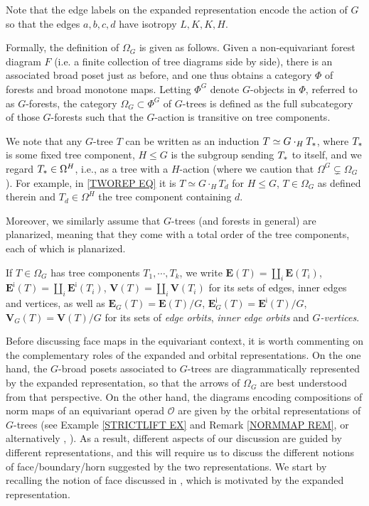 \documentclass[a4paper,10pt
]{article}%
\begin{document}
Note that the edge labels on the expanded representation encode the action of $G$ so that the edges 
$a,b,c,d$ have isotropy $L,K,K,H$.

Formally, the definition of $\Omega_G$ \cite[Def. 5.44]{Per17} is given as follows.
Given a non-equivariant forest diagram $F$ 
(i.e. a finite collection of tree diagrams side by side),
there is
an associated broad poset just as before, and one thus obtains a category $\Phi$ of forests and broad monotone maps.
Letting $\Phi^G$ denote $G$-objects in $\Phi$, referred to as $G$-forests,
the category $\Omega_G \subset \Phi^G$ of $G$-trees
is defined as the full subcategory of those $G$-forests such that the $G$-action is transitive on tree components.

We note that any $G$-tree $T$ can be written as
an induction $T \simeq G \cdot_H T_{\**}$, where $T_{\**}$ is some fixed tree component, $H\leq G$ is the subgroup sending $T_{\**}$ to itself,
and we regard $T_{\**} \in \Omega^H$, i.e., as a tree with a $H$-action (where we caution that $\Omega^G \subsetneq \Omega_G$).
For example, in \eqref{TWOREP EQ} it is 
$T \simeq G \cdot_H T_d$ for $H\leq G$, $T \in \Omega_G$ as defined therein and
$T_d \in \Omega^H$ the tree component containing $d$. 

Moreover, we similarly assume that $G$-trees (and forests in general) are planarized, meaning that they come with a total order of the tree components, each of which is  planarized.

If $T\in \Omega_G$ has tree components $T_1,\cdots, T_k$, we write
$\boldsymbol{E}(T) = \amalg_i \boldsymbol{E}(T_i)$, 
$\boldsymbol{E}^{\mathsf{i}}(T) = 
\amalg_i \boldsymbol{E}^{\mathsf{i}}(T_i)$,
$\boldsymbol{V}(T) = \amalg_i \boldsymbol{V}(T_i)$
for its sets of edges, inner edges and vertices, as well as
$\boldsymbol{E}_G(T) = \boldsymbol{E}(T)/G$,
$\boldsymbol{E}^{\mathsf{i}}_G(T) = \boldsymbol{E}^{\mathsf{i}}(T)/G$,
$\boldsymbol{V}_G(T) = \boldsymbol{V}(T)/G$ for its sets of 
\textit{edge orbits},
\textit{inner edge orbits} and
\textit{$G$-vertices}.

Before discussing face maps in the equivariant context, it is worth commenting on the complementary roles of the expanded and orbital representations.
On the one hand, the $G$-broad posets associated to $G$-trees are diagrammatically represented by the expanded representation,
so that the arrows of $\Omega_{G}$ are best understood from that perspective.
On the other hand, the diagrams encoding compositions of norm maps of an equivariant operad $\mathcal{O}$
are given by the orbital representations of  
$G$-trees (see Example \ref{STRICTLIFT EX} and Remark \ref{NORMMAP REM}, or alternatively 
\cite[Ex. 4.9]{Per17}, \cite[(1.10)]{BP17}).
As a result, different aspects of our discussion are guided by different representations, and this will require us to discuss the different notions of face/boundary/horn suggested by the two representations.
We start by recalling the notion of face discussed in \cite{Per17}, which is motivated by the expanded representation.
\end{document}
